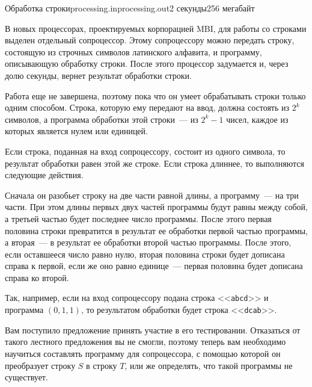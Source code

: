 \begin{problem}{Обработка строки}{processing.in}{processing.out}{2 секунды}{256 мегабайт}


В новых процессорах, проектируемых корпорацией MBI, для работы со строками 
выделен отдельный сопроцессор. Этому сопроцессору можно передать строку, состоящую из строчных 
символов латинского алфавита, и программу, описывающую обработку строки. После этого 
процессор задумается и, через долю секунды, вернет результат обработки строки.

Работа еще не завершена, поэтому пока что он умеет обрабатывать
строки только одним способом. Строка, которую ему передают на ввод, должна состоять из $2^k$ символов, 
а программа обработки этой строки~--- из $2^k - 1$ чисел, каждое из которых является нулем 
или единицей. 

Если строка, поданная на вход сопроцессору, состоит из одного символа, то результат
обработки равен этой же строке. Если строка длиннее, то выполняются следующие действия.

Сначала он разобьет строку на две части равной длины, а программу~--- на три части. 
При этом длины первых двух частей программы будут равны между собой, а третьей частью будет последнее число программы. 
После этого первая половина строки превратится в результат ее обработки первой частью программы, 
а вторая~--- в результат ее обработки второй частью программы. После этого, если оставшееся число равно нулю, 
вторая половина строки будет дописана справа к первой, если же оно равно единице~--- первая половина 
будет дописана справа ко второй.

Так, например, если на вход сопроцессору подана строка <<\texttt{abcd}>> и программа $(0, 1, 1)$, то результатом
обработки будет строка <<\texttt{dcab}>>.


Вам поступило предложение принять участие в его тестировании. Отказаться 
от такого лестного предложения вы не смогли, поэтому теперь вам необходимо научиться составлять 
программу для сопроцессора, с помощью которой он преобразует строку $S$ в строку $T$, или же 
определять, что такой программы не существует.


\end{problem}
